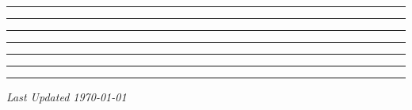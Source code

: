 \documentclass[10pt,landscape,a4paper]{article}
\begin{document}
\small
\begin{multicols*}{4}
	
\setcounter{section}{0}
 \hrule
 \hrule
 \hrule
 \hrule
 \hrule
 \hrule
 \hrule

\begin{center}
	\emph{Last Updated \today}
\end{center}

\end{multicols*}
\end{document}
